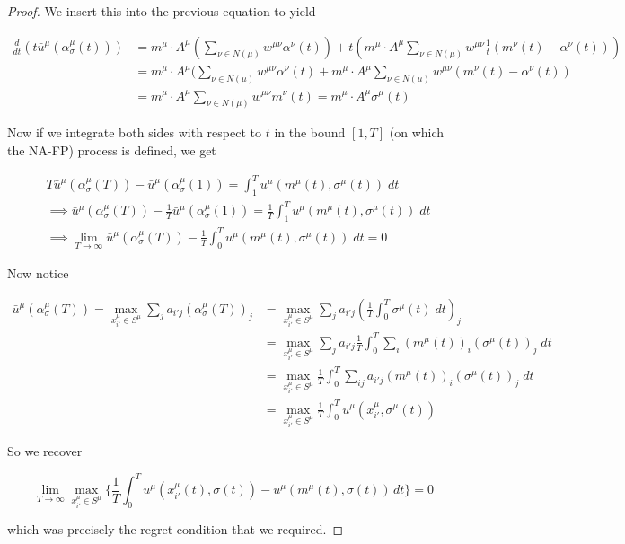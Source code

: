 \documentclass{article}
\theoremstyle{definition}
\begin{document}
\begin{proof}
		We insert this into the previous equation to yield

		\begin{align}
			\frac{d}{dt} (t \bar{u}^\mu (\alpha_\sigma^\mu (t))) & = m^\mu \cdot A^\mu (\sum_{\nu \in N(\mu)} w^{\mu \nu} \alpha^\nu (t)) + t(m^\mu \cdot A^\mu \sum_{\nu \in N(\mu)} w^{\mu \nu} \frac{1}{t} (m^\nu(t) - \alpha^\nu (t))) \\
			& = m^\mu \cdot A^\mu (\sum_{\nu \in N(\mu)} w^{\mu \nu} \alpha^\nu (t) + m^\mu \cdot A^\mu \sum_{\nu \in N(\mu)} w^{\mu \nu} (m^\nu(t) - \alpha^\nu (t)) \\
			& = m^\mu \cdot A^\mu \sum_{\nu \in N(\mu)} w^{\mu \nu} m^\nu(t) = m^\mu \cdot A^\mu \sigma^\mu(t) 
		\end{align}


		Now if we integrate both sides with respect to $t$ in the bound $[1, T]$ (on which the NA-FP) process is defined, we get

		\begin{align}
			&  T \bar{u}^\mu (\alpha_\sigma^\mu (T)) - \bar{u}^\mu (\alpha_\sigma^\mu (1)) = \int_1^T u^\mu (m^\mu(t), \sigma^\mu(t)) \; dt \\
			& \implies \bar{u}^\mu (\alpha_\sigma^\mu (T)) - \frac{1}{T} \bar{u}^\mu (\alpha_\sigma^\mu (1)) = \frac{1}{T} \int_1^T u^\mu (m^\mu(t), \sigma^\mu(t)) \; dt \\
			& \implies \lim_{T \rightarrow \infty} \bar{u}^\mu (\alpha_\sigma^\mu (T)) - \frac{1}{T} \int_0^T u^\mu (m^\mu(t), \sigma^\mu(t)) \; dt = 0
		\end{align}

		Now notice

		\begin{align}
			\bar{u}^\mu (\alpha_\sigma^\mu (T)) = \max_{x^\mu_{i'} \in S^\mu} \sum_{j} a_{i'j} (\alpha_{\sigma}^\mu (T))_j & = \max_{x^\mu_{i'} \in S^\mu} \sum_{j} a_{i'j} (\frac{1}{T} \int_{0}^{T} \sigma^\mu(t) \; dt)_j \\
			& = \max_{x^\mu_{i'} \in S^\mu} \sum_{j} a_{i'j} \frac{1}{T} \int_{0}^{T} \sum_i (m^\mu (t))_i (\sigma^\mu(t))_j \; dt\\
			& = \max_{x^\mu_{i'} \in S^\mu} \frac{1}{T} \int_0^T \sum_{ij} a_{i'j} (m^\mu (t))_i (\sigma^\mu(t))_j \; dt\\
			& = \max_{x^\mu_{i'} \in S^\mu} \frac{1}{T} \int_0^T u^\mu(x^\mu_{i'}, \sigma^\mu(t))
		\end{align}

		So we recover

		\begin{equation}
			\lim_{T \rightarrow \infty} \max_{x_{i'}^\mu \in S^\mu} \Big\{ \frac{1}{T} \int_{0}^{T} u^{\mu}(x_{i'}^\mu(t), \sigma(t)) - u^{\mu}(m^\mu(t), \sigma(t)) \, dt \Big\} = 0
		\end{equation}

		which was precisely the regret condition that we required.

	\end{proof}
\end{document}
